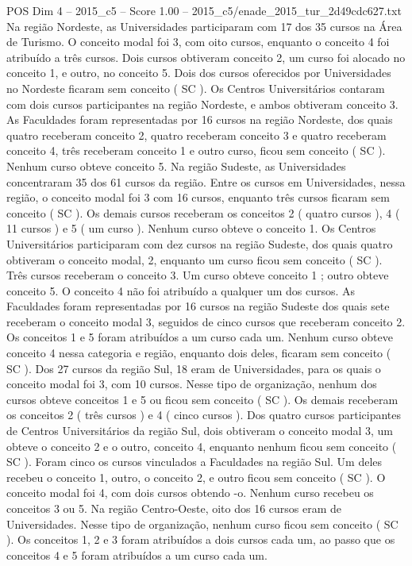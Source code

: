 \begin{textsample}{POS Dim 4 – 2015\_c5 – Score 1.00 – 2015\_c5/enade\_2015\_tur\_2d49cdc627.txt}
Na região Nordeste, as Universidades participaram com 17 dos 35 cursos na Área de Turismo.
O conceito modal foi 3, com oito cursos, enquanto o conceito 4 foi atribuído a três cursos.
Dois cursos obtiveram conceito 2, um curso foi alocado no conceito 1, e outro, no conceito 5.
Dois dos cursos oferecidos por Universidades no Nordeste ficaram sem conceito ( SC ).
Os Centros Universitários contaram com dois cursos participantes na região Nordeste, e ambos obtiveram conceito 3.
As Faculdades foram representadas por 16 cursos na região Nordeste, dos quais quatro receberam conceito 2, quatro receberam conceito 3 e quatro receberam conceito 4, três receberam conceito 1 e outro curso, ficou sem conceito ( SC ).
Nenhum curso obteve conceito 5.
Na região Sudeste, as Universidades concentraram 35 dos 61 cursos da região.
Entre os cursos em Universidades, nessa região, o conceito modal foi 3 com 16 cursos, enquanto três cursos ficaram sem conceito ( SC ).
Os demais cursos receberam os conceitos 2 ( quatro cursos ), 4 ( 11 cursos ) e 5 ( um curso ).
Nenhum curso obteve o conceito 1.
Os Centros Universitários participaram com dez cursos na região Sudeste, dos quais quatro obtiveram o conceito modal, 2, enquanto um curso ficou sem conceito ( SC ).
Três cursos receberam o conceito 3.
Um curso obteve conceito 1 ; outro obteve conceito 5.
O conceito 4 não foi atribuído a qualquer um dos cursos.
As Faculdades foram representadas por 16 cursos na região Sudeste dos quais sete receberam o conceito modal 3, seguidos de cinco cursos que receberam conceito 2.
Os conceitos 1 e 5 foram atribuídos a um curso cada um.
Nenhum curso obteve conceito 4 nessa categoria e região, enquanto dois deles, ficaram sem conceito ( SC ).
Dos 27 cursos da região Sul, 18 eram de Universidades, para os quais o conceito modal foi 3, com 10 cursos.
Nesse tipo de organização, nenhum dos cursos obteve conceitos 1 e 5 ou ficou sem conceito ( SC ).
Os demais receberam os conceitos 2 ( três cursos ) e 4 ( cinco cursos ).
Dos quatro cursos participantes de Centros Universitários da região Sul, dois obtiveram o conceito modal 3, um obteve o conceito 2 e o outro, conceito 4, enquanto nenhum ficou sem conceito ( SC ).
Foram cinco os cursos vinculados a Faculdades na região Sul.
Um deles recebeu o conceito 1, outro, o conceito 2, e outro ficou sem conceito ( SC ).
O conceito modal foi 4, com dois cursos obtendo -o.
Nenhum curso recebeu os conceitos 3 ou 5.
Na região Centro-Oeste, oito dos 16 cursos eram de Universidades.
Nesse tipo de organização, nenhum curso ficou sem conceito ( SC ).
Os conceitos 1, 2 e 3 foram atribuídos a dois cursos cada um, ao passo que os conceitos 4 e 5 foram atribuídos a um curso cada um.

\end{textsample}
